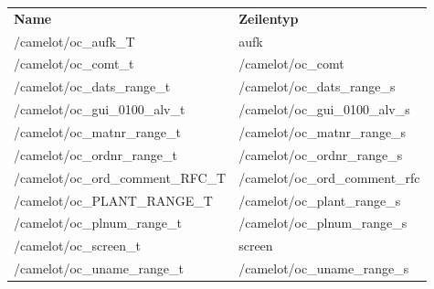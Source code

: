 \begin{tabularx}{\textwidth}{lX}
\rowcolor{heading}\textbf{Name} & \textbf{Zeilentyp} \\
/camelot/oc\_aufk\_T & aufk \\
\rowcolor{odd}/camelot/oc\_comt\_t & /camelot/oc\_comt \\
/camelot/oc\_dats\_range\_t & /camelot/oc\_dats\_range\_s \\
\rowcolor{odd}	/camelot/oc\_gui\_0100\_alv\_t & /camelot/oc\_gui\_0100\_alv\_s \\
/camelot/oc\_matnr\_range\_t & /camelot/oc\_matnr\_range\_s \\
\rowcolor{odd}/camelot/oc\_ordnr\_range\_t & /camelot/oc\_ordnr\_range\_s \\
/camelot/oc\_ord\_comment\_RFC\_T & /camelot/oc\_ord\_comment\_rfc \\
\rowcolor{odd}/camelot/oc\_PLANT\_RANGE\_T & /camelot/oc\_plant\_range\_s \\
/camelot/oc\_plnum\_range\_t & /camelot/oc\_plnum\_range\_s \\
\rowcolor{odd}/camelot/oc\_screen\_t & screen \\
/camelot/oc\_uname\_range\_t & /camelot/oc\_uname\_range\_s \\
\end{tabularx}